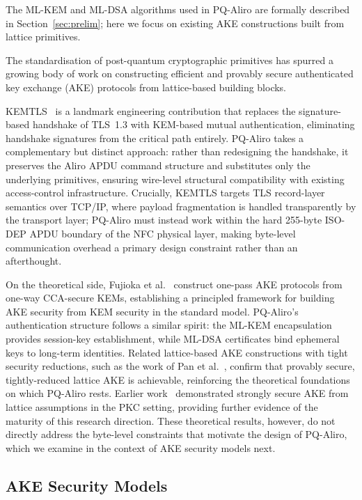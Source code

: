 \documentclass[runningheads]{llncs}
\begin{document}
The ML-KEM and ML-DSA algorithms used in PQ-Aliro are formally described in Section~\ref{sec:prelim}; here we focus on existing AKE constructions built from lattice primitives.

The standardisation of post-quantum cryptographic primitives has spurred a
growing body of work on constructing efficient and provably secure authenticated
key exchange (AKE) protocols from lattice-based building blocks.

{\sloppy
KEMTLS~\cite{CCS:SchSteWig20} is a landmark engineering contribution that
replaces the signature-\allowbreak based handshake of TLS~1.3 with KEM-based mutual
authentication, eliminating handshake signatures from the critical path entirely.
PQ-Aliro takes a complementary but distinct approach: rather than redesigning
the handshake, it preserves the Aliro APDU command structure and substitutes
only the underlying primitives, ensuring wire-level structural compatibility
with existing access-control infrastructure.
Crucially, KEMTLS targets TLS record-layer semantics over TCP/IP, where
payload fragmentation is handled transparently by the transport layer; PQ-Aliro
must instead work within the hard 255-byte ISO-DEP APDU boundary of the NFC
physical layer, making byte-level communication overhead a primary design
constraint rather than an afterthought.
\par}

On the theoretical side, Fujioka et al.~\cite{ASIACCS:FSXY13} construct
one-pass AKE protocols from one-way CCA-secure KEMs, establishing a principled
framework for building AKE security from KEM security in the standard model.
PQ-Aliro's authentication structure follows a similar spirit: the ML-KEM
encapsulation provides session-key establishment, while ML-DSA certificates
bind ephemeral keys to long-term identities.
Related lattice-based AKE constructions with tight security reductions, such as
the work of Pan et al.~\cite{C:PanWagZen23}, confirm that provably secure,
tightly-reduced lattice AKE is achievable, reinforcing the theoretical
foundations on which PQ-Aliro rests.
Earlier work~\cite{PKC:FSXY12} demonstrated strongly secure AKE from lattice
assumptions in the PKC setting, providing further evidence of the maturity of
this research direction.
These theoretical results, however, do not directly address the byte-level
constraints that motivate the design of PQ-Aliro, which we examine in the
context of AKE security models next.

\subsection{AKE Security Models}
\label{sec:related:models}
\end{document}
